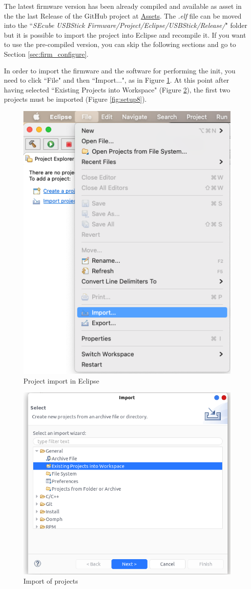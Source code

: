The latest firmware version has been already compiled and available as asset in the the last Release of the GitHub project at \href{https://github.com/SEcube-Project/Browser-Password-Manager/releases}{Assets}. The \textit{.elf} file can be moved into the ``\textit{SEcube USBStick Firmware/Project/Eclipse/USBStick/Release/}" folder but it is possible to import the project into Eclipse and recompile it. If you want to use the pre-compiled version, you can skip the following sections and go to Section \ref{sec:firm_configure}.

In order to import the firmware and the software for performing the init, you need to click ``File" and then ``Import...", as in Figure \ref{fig:setup6}. At this point after having selected ``Existing Projects into Workspace" (Figure \ref{fig:setup7}), the first two projects must be imported (Figure \ref{fig:setup8}).
\begin{figure}[H]
	\centering
	\includegraphics[width=0.45\linewidth]{images/firmware/setup_6}
	\caption{Project import in Eclipse}
	\label{fig:setup6}
\end{figure}
\begin{figure}[H]
	\centering
	\includegraphics[width=0.6\linewidth]{images/firmware/setup_7}
	\caption{Import of projects}
	\label{fig:setup7}
\end{figure}

